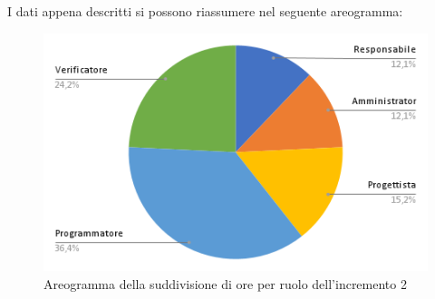 \pagebreak
I dati appena descritti si possono riassumere nel seguente areogramma:
\begin{figure}[!h]
    \vspace{5px}
    \includegraphics[scale=0.5]{../../../Images/Diagrammi/Diagramma a torta/areogrammaIncremento15.png}
    \centering
    \caption{Areogramma della suddivisione di ore per ruolo dell'incremento 2}
\end{figure}

